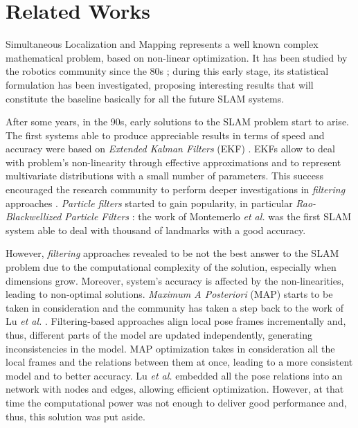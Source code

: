\chapter{Related Works}\label{ch:related}
Simultaneous Localization and Mapping represents a well known complex mathematical problem, based on non-linear optimization. It has been studied by the robotics community since the 80s \cite{durrant2006simultaneous} \cite{bailey2006simultaneous}; during this early stage, its statistical formulation has been investigated, proposing interesting results that will constitute the baseline basically for all the future SLAM systems.

After some years, in the 90s, early solutions to the SLAM problem start to arise. The first systems able to produce appreciable results in terms of speed and accuracy were based on \textit{Extended Kalman Filters} (EKF) \cite{leonard1990dynamic} \cite{dissanayake2001solution}. EKFs allow to deal with problem's non-linearity through effective approximations and to represent multivariate distributions with a small number of parameters. This success encouraged the research community to perform deeper investigations in \textit{filtering} approaches \cite{aulinas2008filtering_review}. \textit{Particle filters} started to gain popularity, in particular \textit{Rao-Blackwellized Particle Filters} \cite{grisetti2005improving}: the work of Montemerlo \textit{et al.} \cite{montemerlo2002fastslam} was the first SLAM system able to deal with thousand of landmarks with a good accuracy. 

However, \textit{filtering} approaches revealed to be not the best answer to the SLAM problem due to the computational complexity of the solution, especially when dimensions grow. Moreover, system's accuracy is affected by the non-linearities, leading to non-optimal solutions. \textit{Maximum A Posteriori} (MAP) starts to be taken in consideration and the community has taken a step back to the work of Lu \textit{et al.} \cite{lu1997globally}. Filtering-based approaches align local pose frames incrementally and, thus, different parts of the model are updated independently, generating inconsistencies in the model. MAP optimization takes in consideration all the local frames and the relations between them at once, leading to a more consistent model and to better accuracy. Lu \textit{et al.} embedded all the pose relations into an network with nodes and edges, allowing efficient optimization. However, at that time the computational power was not enough to deliver good performance and, thus, this solution was put aside.

